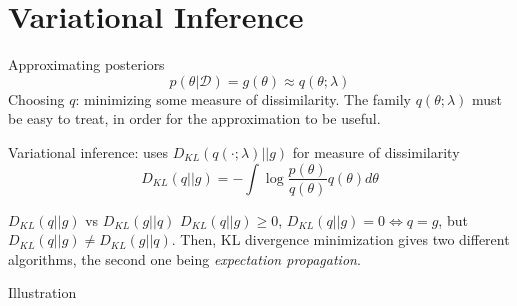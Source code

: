 \documentclass{beamer}
\begin{document}
\section{Variational Inference}
\begin{frame}{}
\begin{block}{Approximating posteriors}
	\begin{equation*}
	p(\theta|\mathcal{D}) = g(\theta) \approx q(\theta;\lambda)
	\end{equation*}
	Choosing $q$: minimizing some measure of dissimilarity. The family $q(\theta;\lambda)$ must be easy to treat, in order for the approximation to be useful.
	
	Variational inference: uses $D_{KL}(q(\cdot;\lambda)||g)$ for measure of dissimilarity
	\begin{equation*}
	D_{KL}(q||g) = -\int \log \frac{p(\theta)}{q(\theta)} q(\theta) d\theta
	\end{equation*}
	
\end{block}
\begin{block}{$D_{KL}(q||g)$ vs $D_{KL}(g||q)$}
	$D_{KL}(q||g) \geq 0$, $D_{KL}(q||g) = 0 \iff q=g$, but $D_{KL}(q||g) \neq D_{KL}(g||q)$. 
	Then, KL divergence minimization gives two different algorithms, the second one being \textit{expectation propagation}.
	
\end{block}
\end{frame}

\begin{frame}{}
\begin{block}{Illustration}
\begin{figure}
	\centering
	\captionsetup[subfigure]{labelformat=empty}
\end{figure}
\end{block}
\end{frame}
\end{document}
